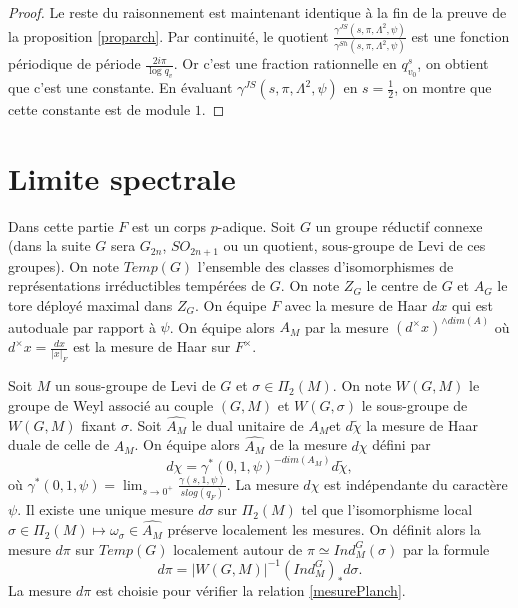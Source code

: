 \documentclass{amsart}
\begin{document}
\begin{proof}
 Le reste du raisonnement est maintenant identique à la fin de la preuve de la proposition \ref{proparch}. Par continuité, le quotient $\frac{\gamma^{JS}(s, \pi, \Lambda^2, \psi)}{\gamma^{Sh}(s, \pi, \Lambda^2, \psi)}$ est une fonction périodique de période $\frac{2i\pi}{\log q_v}$. Or c'est une fraction rationnelle en $q_{v_0}^s$, on obtient que c'est une constante. En évaluant $\gamma^{JS}(s, \pi, \Lambda^2, \psi)$ en $s=\frac{1}{2}$, on montre que cette constante est de module $1$.
 \end{proof}
 
 
 
 \section{Limite spectrale}
 
 Dans cette partie $F$ est un corps $p$-adique. Soit $G$ un groupe réductif connexe (dans la suite $G$ sera $G_{2n}$, $SO_{2n+1}$ ou un quotient, sous-groupe de Levi de ces groupes). On note $Temp(G)$ l'ensemble des classes d'isomorphismes de représentations irréductibles tempérées de $G$. On note $Z_G$ le centre de $G$ et $A_G$ le tore déployé maximal dans $Z_G$. On équipe $F$ avec la mesure de Haar $dx$ qui est autoduale par rapport à $\psi$. On équipe alors $A_M$ par la mesure $(d^\times x)^{\wedge dim(A)}$ où $d^\times x = \frac{dx}{|x|_F}$ est la mesure de Haar sur $F^\times$.

Soit $M$ un sous-groupe de Levi de $G$ et $\sigma \in \Pi_2(M)$. On note $W(G, M)$ le groupe de Weyl associé au couple $(G,M)$ et $W(G, \sigma)$ le sous-groupe de $W(G, M)$ fixant $\sigma$. Soit $\widehat{A_M}$ le dual unitaire de $A_M$et $d\widetilde{\chi}$ la mesure de Haar duale de celle de $A_M$. On équipe alors $\widehat{A_M}$ de la mesure $d\chi$ défini par
\begin{equation}
d\chi = \gamma^*(0, 1, \psi)^{-dim(A_M)}d\widetilde{\chi},
\end{equation}
où $\gamma^*(0, 1, \psi) = \lim_{s \rightarrow 0^+} \frac{\gamma(s, 1, \psi)}{s log(q_F)}$. La mesure $d\chi$ est indépendante du caractère $\psi$. Il existe une unique mesure $d\sigma$ sur $\Pi_2(M)$ tel que l'isomorphisme local $\sigma \in \Pi_2(M) \mapsto \omega_{\sigma} \in \widehat{A_M}$ préserve localement les mesures. On définit alors la mesure $d\pi$ sur $Temp(G)$ localement autour de $\pi \simeq Ind_M^G(\sigma)$ par la formule
\begin{equation}
d\pi  = |W(G, M)|^{-1} (Ind_M^G)_* d\sigma.
\end{equation}
La mesure $d\pi$ est choisie pour vérifier la relation \ref{mesurePlanch}.
\end{document}
